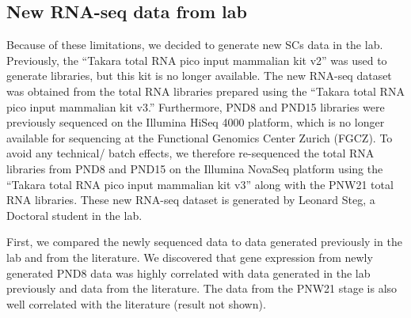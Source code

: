 \documentclass[12pt,twoside]{reedthesis}
\begin{document}
\hypertarget{new-rna-seq-data-from-lab}{%
\subsection{New RNA-seq data from lab}\label{new-rna-seq-data-from-lab}}

Because of these limitations, we decided to generate new SCs data in the
lab. Previously, the ``Takara total RNA pico input mammalian kit v2'' was
used to generate libraries, but this kit is no longer available. The new
RNA-seq dataset was obtained from the total RNA libraries prepared using
the ``Takara total RNA pico input mammalian kit v3.'' Furthermore, PND8
and PND15 libraries were previously sequenced on the Illumina HiSeq 4000
platform, which is no longer available for sequencing at the Functional
Genomics Center Zurich (FGCZ). To avoid any technical/ batch effects, we
therefore re-sequenced the total RNA libraries from PND8 and PND15 on
the Illumina NovaSeq platform using the ``Takara total RNA pico input
mammalian kit v3'' along with the PNW21 total RNA libraries. These new RNA-seq dataset is generated by Leonard Steg, a Doctoral student in the lab.

First, we compared the newly sequenced data to data generated previously
in the lab and from the literature. We discovered that gene expression
from newly generated PND8 data was highly correlated with data generated
in the lab previously and data from the literature. The data from the
PNW21 stage is also well correlated with the literature (result not
shown).
\end{document}
